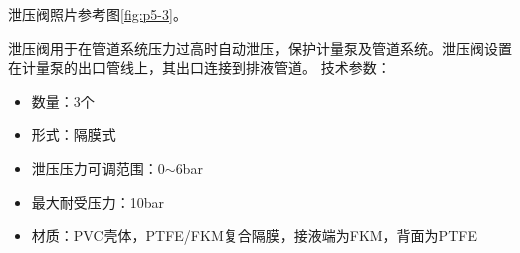
%
%
%        
%

\par 泄压阀照片参考图\ref{fig:p5-3}。
\par 泄压阀用于在管道系统压力过高时自动泄压，保护计量泵及管道系统。泄压阀设置在计量泵的出口管线上，其出口连接到排液管道。
技术参数：
\begin{itemize}
    \item 数量：3个
    \item 形式：隔膜式
    \item 泄压压力可调范围：0$\sim$6bar
    \item 最大耐受压力：10bar
    \item 材质：PVC壳体，PTFE/FKM复合隔膜，接液端为FKM，背面为PTFE
\end{itemize}

